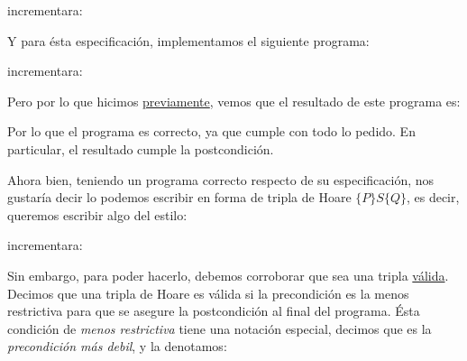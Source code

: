 \documentclass[../main.tex]{subfiles}
\begin{document}
\begin{proc}{incrementar}{\Inout a: \Z}{}
\end{proc}

\nln

Y para ésta especificación, implementamos el siguiente programa:


\begin{proc}{incrementar}{\Inout a: \Z}{}
           \par
      \par
         \par
\end{proc} \label{specification_example_1}


Pero por lo que hicimos \hyperref[correct_program_example]{previamente}, vemos que el resultado de este programa es:

\begin{center}
{\textcolor{blue}{}}
\end{center}

\nln

Por lo que el programa es correcto, ya que cumple con todo lo pedido. En particular, el resultado cumple la postcondición.

Ahora bien, teniendo un programa correcto respecto de su especificación, nos gustaría decir lo podemos escribir en forma de tripla de Hoare $\{P\}S\{Q\}$, es decir, queremos
escribir algo del estilo:

\begin{proc}{incrementar}{\Inout a: \Z}{}
           \par
      \par
         \par
\end{proc} \label{specification_example_1_triplet}

Sin embargo, para poder hacerlo, debemos corroborar que sea una tripla \ul{válida}. Decimos que una tripla de Hoare es válida si la precondición es la menos restrictiva para que se
asegure la postcondición al final del programa. Ésta condición de \textit{menos restrictiva} tiene una notación especial, decimos que es la \textit{precondición más debil}, y la denotamos:
\end{document}
